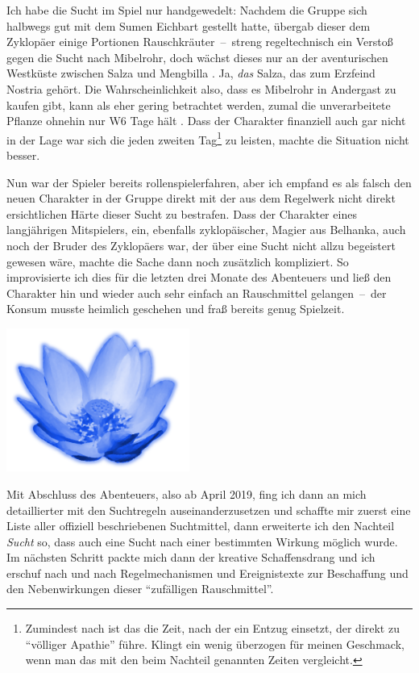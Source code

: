 Ich habe die Sucht im Spiel nur handgewedelt: Nachdem die Gruppe sich halbwegs gut mit dem Sumen Eichbart gestellt hatte, übergab dieser dem Zyklopäer einige Portionen Rauschkräuter~--~streng regeltechnisch ein Verstoß gegen die Sucht nach Mibelrohr, doch wächst dieses nur an der aventurischen Westküste zwischen Salza und Mengbilla \cite[S.~251]{ZBA}. Ja, \emph{das} Salza, das zum Erzfeind Nostria gehört. Die Wahrscheinlichkeit also, dass es Mibelrohr in Andergast zu kaufen gibt, kann als eher gering betrachtet werden, zumal die unverarbeitete Pflanze ohnehin nur W6 Tage hält \cite[S.~251]{ZBA}. Dass der Charakter finanziell auch gar nicht in der Lage war sich die  jeden zweiten Tag\footnote{Zumindest nach  ist das die Zeit, nach der ein Entzug einsetzt, der direkt zu \enquote{völliger Apathie} führe. Klingt ein wenig überzogen für meinen Geschmack, wenn man das mit den beim Nachteil genannten Zeiten vergleicht.} zu leisten, machte die Situation nicht besser.

Nun war der Spieler bereits rollenspielerfahren, aber ich empfand es als falsch den neuen Charakter in der Gruppe direkt mit der aus dem Regelwerk nicht direkt ersichtlichen Härte dieser Sucht zu bestrafen. Dass der Charakter eines langjährigen Mitspielers, ein, ebenfalls zyklopäischer, Magier aus Belhanka, auch noch der Bruder des Zyklopäers war, der über eine Sucht nicht allzu begeistert gewesen wäre, machte die Sache dann noch zusätzlich kompliziert. So improvisierte ich dies für die letzten drei Monate des Abenteuers und ließ den Charakter hin und wieder auch sehr einfach an Rauschmittel gelangen~--~der Konsum musste heimlich geschehen und fraß bereits genug Spielzeit.

\vfill
\begin{center}
	\label{img-white-lotus}
	\includegraphics[width=6cm]{res/Nelumbo_lutea_blossom.png}
\end{center}

Mit Abschluss des Abenteuers, also ab April 2019, fing ich dann an mich detaillierter mit den Suchtregeln auseinanderzusetzen und schaffte mir zuerst eine Liste aller offiziell beschriebenen Suchtmittel, dann erweiterte ich den Nachteil \emph{Sucht} so, dass auch eine Sucht nach einer bestimmten Wirkung möglich wurde. Im nächsten Schritt packte mich dann der kreative Schaffensdrang und ich erschuf nach und nach Regelmechanismen und Ereignistexte zur Beschaffung und den Nebenwirkungen dieser \enquote{zufälligen Rauschmittel}.

